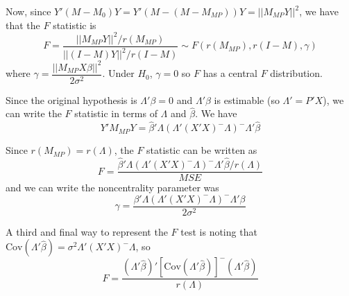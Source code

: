 \documentclass[12pt]{article}
\newcommand{\Cov}{\mathrm{Cov}}
\newcommand{\bhat}{\hat{\beta}}
\numberwithin{equation}{section}
\begin{document}
Now, since $Y'(M - M_0)Y = Y'(M - (M - M_{MP}))Y = ||M_{MP}Y||^2$, we have that the $F$ statistic is
%
\begin{equation*}
  F = \frac{||M_{MP}Y||^2 / r(M_{MP})}{||(I - M)Y||^2 / r(I - M)} \sim F(r(M_{MP}), r(I - M), \gamma)
\end{equation*}
where $\gamma = \dfrac{||M_{MP}X\beta||^2}{2\sigma^2}$. Under $H_0$, $\gamma = 0$ so $F$ has a central $F$ distribution.

Since the original hypothesis is $\Lambda'\beta = 0$ and $\Lambda'\beta$ is estimable (so $\Lambda' = P'X$), we can write the $F$ statistic in terms of $\Lambda$ and $\bhat$. We have
%
\begin{equation*}
  Y'M_{MP}Y = \bhat'\Lambda(\Lambda'(X'X)^{-}\Lambda)^{-} \Lambda' \bhat
\end{equation*}
%

Since $r(M_{MP}) = r(\Lambda)$, the $F$ statistic can be written as
%
\begin{equation*}
  F = \frac{\bhat'\Lambda(\Lambda'(X'X)^{-}\Lambda)^{-} \Lambda' \bhat / r(\Lambda)}{MSE}
\end{equation*}
%
and we can write the noncentrality parameter was
\begin{equation*}
  \gamma = \frac{\beta' \Lambda (\Lambda' (X'X)^{-} \Lambda)^{-} \Lambda' \beta}{2\sigma^2}
\end{equation*}
%

A third and final way to represent the $F$ test is noting that $\Cov(\Lambda'\bhat) = \sigma^2 \Lambda'(X'X)^{-} \Lambda$, so
%
\begin{equation*}
  F = \frac{(\Lambda'\bhat)'[\Cov(\Lambda'\bhat)]^{-} (\Lambda'\bhat)}{r(\Lambda)}
\end{equation*}
%
\end{document}
